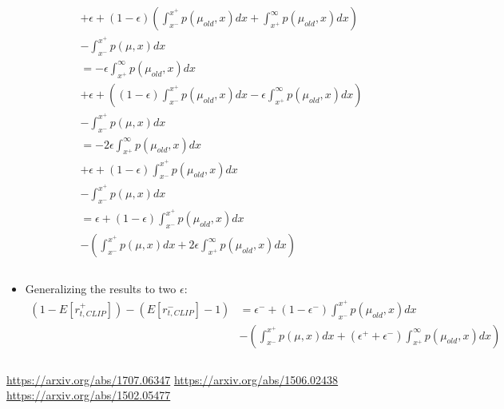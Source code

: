 \documentclass[a4paper]{article}
\begin{document}
\begin{itemize}
\begin{align*}
        &+
        \epsilon
        + 
        (1 - \epsilon)
        \left(
        \int_{x^{-}}^{x^{+}}p(\mu_{old}, x)dx
        +
        \int_{x^{+}}^{\infty}p(\mu_{old}, x)dx
        \right)\\
        &- 
        \int_{x^{-}}^{x^{+}}p(\mu, x)dx 
        \\
        &=
        -\epsilon
        \int_{x^{+}}^{\infty}p(\mu_{old}, x)dx\\
        &+
        \epsilon
        + 
        \left(
        (1 - \epsilon)
        \int_{x^{-}}^{x^{+}}p(\mu_{old}, x)dx
        - \epsilon
        \int_{x^{+}}^{\infty}p(\mu_{old}, x)dx
        \right)\\
        &- 
        \int_{x^{-}}^{x^{+}}p(\mu, x)dx 
        \\
        &=
        -2\epsilon
        \int_{x^{+}}^{\infty}p(\mu_{old}, x)dx\\
        &+
        \epsilon
        + 
        (1 - \epsilon)
        \int_{x^{-}}^{x^{+}}p(\mu_{old}, x)dx
        \\
        &- 
        \int_{x^{-}}^{x^{+}}p(\mu, x)dx 
        \\
        &=
        \epsilon
        + 
        (1 - \epsilon)
        \int_{x^{-}}^{x^{+}}p(\mu_{old}, x)dx
        \\
        &-\left(\int_{x^{-}}^{x^{+}}p(\mu, x)dx 
        +2\epsilon
        \int_{x^{+}}^{\infty}p(\mu_{old}, x)dx\right)\\
        \\
    \end{align*}
    
    \item Generalizing the results to two $\epsilon$:
    \begin{align*}
        (1 - E[r_{t, CLIP}^{+}]) - (E[r_{t, CLIP}^{-}] - 1)
        &=
        \epsilon^-
        + 
        (1 - \epsilon^-)
        \int_{x^{-}}^{x^{+}}p(\mu_{old}, x)dx
        \\
        &-\left(\int_{x^{-}}^{x^{+}}p(\mu, x)dx 
        +(\epsilon^+ + \epsilon^-)
        \int_{x^{+}}^{\infty}p(\mu_{old}, x)dx\right)\\
        \\
    \end{align*}

\end{itemize}

%

\newpage
\begin{thebibliography}{9}
\url{https://arxiv.org/abs/1707.06347}
\url{https://arxiv.org/abs/1506.02438}
\url{https://arxiv.org/abs/1502.05477}
\end{thebibliography}
\end{document}
